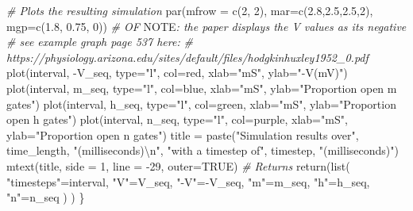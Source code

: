 \documentclass[
]{article}
\newenvironment{Shaded}{\begin{snugshade}}{\end{snugshade}}
\newcommand{\AlertTok}[1]{\textcolor[rgb]{0.94,0.16,0.16}{#1}}
\newcommand{\AttributeTok}[1]{\textcolor[rgb]{0.77,0.63,0.00}{#1}}
\newcommand{\CommentTok}[1]{\textcolor[rgb]{0.56,0.35,0.01}{\textit{#1}}}
\newcommand{\ConstantTok}[1]{\textcolor[rgb]{0.00,0.00,0.00}{#1}}
\newcommand{\DecValTok}[1]{\textcolor[rgb]{0.00,0.00,0.81}{#1}}
\newcommand{\FloatTok}[1]{\textcolor[rgb]{0.00,0.00,0.81}{#1}}
\newcommand{\FunctionTok}[1]{\textcolor[rgb]{0.00,0.00,0.00}{#1}}
\newcommand{\NormalTok}[1]{#1}
\newcommand{\OtherTok}[1]{\textcolor[rgb]{0.56,0.35,0.01}{#1}}
\newcommand{\SpecialCharTok}[1]{\textcolor[rgb]{0.00,0.00,0.00}{#1}}
\newcommand{\StringTok}[1]{\textcolor[rgb]{0.31,0.60,0.02}{#1}}
\begin{document}
\begin{Shaded}
\begin{Highlighting}[]
  \CommentTok{\# Plots the resulting simulation}
  \FunctionTok{par}\NormalTok{(}\AttributeTok{mfrow =} \FunctionTok{c}\NormalTok{(}\DecValTok{2}\NormalTok{, }\DecValTok{2}\NormalTok{), }\AttributeTok{mar=}\FunctionTok{c}\NormalTok{(}\FloatTok{2.8}\NormalTok{,}\FloatTok{2.5}\NormalTok{,}\FloatTok{2.5}\NormalTok{,}\DecValTok{2}\NormalTok{), }\AttributeTok{mgp=}\FunctionTok{c}\NormalTok{(}\FloatTok{1.8}\NormalTok{, }\FloatTok{0.75}\NormalTok{, }\DecValTok{0}\NormalTok{))}
  \CommentTok{\# OF }\AlertTok{NOTE}\CommentTok{: the paper displays the V values as its negative}
  \CommentTok{\# see example graph page 537 here:}
  \CommentTok{\# https://physiology.arizona.edu/sites/default/files/hodgkinhuxley1952\_0.pdf}
  \FunctionTok{plot}\NormalTok{(interval, }\SpecialCharTok{{-}}\NormalTok{V\_seq, }\AttributeTok{type=}\StringTok{"l"}\NormalTok{, }\AttributeTok{col=}\StringTok{\textquotesingle{}red\textquotesingle{}}\NormalTok{, }
       \AttributeTok{xlab=}\StringTok{"mS"}\NormalTok{, }\AttributeTok{ylab=}\StringTok{"{-}V(mV)"}\NormalTok{)}
  \FunctionTok{plot}\NormalTok{(interval, m\_seq, }\AttributeTok{type=}\StringTok{"l"}\NormalTok{, }\AttributeTok{col=}\StringTok{\textquotesingle{}blue\textquotesingle{}}\NormalTok{, }
       \AttributeTok{xlab=}\StringTok{"mS"}\NormalTok{, }\AttributeTok{ylab=}\StringTok{"Proportion open m gates"}\NormalTok{)}
  \FunctionTok{plot}\NormalTok{(interval, h\_seq, }\AttributeTok{type=}\StringTok{"l"}\NormalTok{, }\AttributeTok{col=}\StringTok{\textquotesingle{}green\textquotesingle{}}\NormalTok{, }
       \AttributeTok{xlab=}\StringTok{"mS"}\NormalTok{, }\AttributeTok{ylab=}\StringTok{"Proportion open h gates"}\NormalTok{)}
  \FunctionTok{plot}\NormalTok{(interval, n\_seq, }\AttributeTok{type=}\StringTok{"l"}\NormalTok{, }\AttributeTok{col=}\StringTok{\textquotesingle{}purple\textquotesingle{}}\NormalTok{,}
       \AttributeTok{xlab=}\StringTok{"mS"}\NormalTok{, }\AttributeTok{ylab=}\StringTok{"Proportion open n gates"}\NormalTok{)}
\NormalTok{  title }\OtherTok{=} \FunctionTok{paste}\NormalTok{(}\StringTok{"Simulation results over"}\NormalTok{, time\_length, }\StringTok{"(milliseconds)}\SpecialCharTok{\textbackslash{}n}\StringTok{"}\NormalTok{,}
                \StringTok{"with a timestep of"}\NormalTok{, timestep, }\StringTok{"(milliseconds)"}\NormalTok{)}
  \FunctionTok{mtext}\NormalTok{(title, }\AttributeTok{side =} \DecValTok{1}\NormalTok{, }\AttributeTok{line =} \SpecialCharTok{{-}}\DecValTok{29}\NormalTok{, }\AttributeTok{outer=}\ConstantTok{TRUE}\NormalTok{)}
  \CommentTok{\# Returns}
  \FunctionTok{return}\NormalTok{(}\FunctionTok{list}\NormalTok{(}
    \StringTok{"timesteps"}\OtherTok{=}\NormalTok{interval, }
    \StringTok{"V"}\OtherTok{=}\NormalTok{V\_seq, }\StringTok{"{-}V"}\OtherTok{=}\SpecialCharTok{{-}}\NormalTok{V\_seq,}
    \StringTok{"m"}\OtherTok{=}\NormalTok{m\_seq, }\StringTok{"h"}\OtherTok{=}\NormalTok{h\_seq, }\StringTok{"n"}\OtherTok{=}\NormalTok{n\_seq}
\NormalTok{    )}
\NormalTok{  )}
\NormalTok{\}}
\end{Highlighting}
\end{Shaded}
\end{document}
